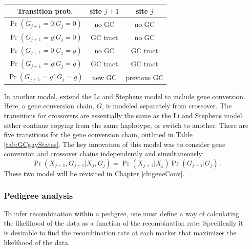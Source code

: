 \begin{table} \vspace{-20pt}
\begin{SingleSpacing}
\begin{tabular}{|c|c|c|} 
    \hline Transition prob. & site $j+1$ & site $j$ \\ \hline
    $\Pr(G_{j+1}=0|G_{j}=0)$  & no GC & no GC \\
    $\Pr(G_{j+1}=g|G_{j}=0)$  & GC tract   & no GC  \\
    $\Pr(G_{j+1}=0|G_{j}=g)$  & no GC & GC tract \\
    $\Pr(G_{j+1}=g|G_{j}=g)$  & GC tract   & GC  tract\\
    $\Pr(G_{j+1}=g'|G_{j}=g)$ &  new GC & previous GC  \\
\hline \end{tabular} \vspace{-5pt}
\end{SingleSpacing}
\vspace{-10pt}
\end{table}
%
In another model, \citet{Gay2007} extend the Li and Stephens model to include gene conversion.
Here, a gene conversion chain, $G$, is modeled separately from crossover.
The transitions for crossovers are essentially the same as the Li and Stephens model: either continue copying from the same haplotype, or switch to another.
There are five transitions for the gene conversion chain, outlined in Table \ref{tab:GCgayStates}.
The key innovation of this model was to consider gene conversion and crossover chains independently and simultaneously:
\begin{equation} \Pr(X_{j+1}, G_{j+1} | X_{j},G_{j} ) = \Pr(X_{j+1}|X_{j}) \Pr(G_{j+1}|G_{j}) ~. \end{equation}
%
These two model will be revisited in Chapter \ref{ch:geneConv}.


\subsubsection{Pedigree analysis}

To infer recombination within a pedigree, one must define a way of calculating the likelihood of the data as a function of the recombination rate.
Specifically it is desirable to find the recombination rate at each marker that maximizes the likelihood of the data.


